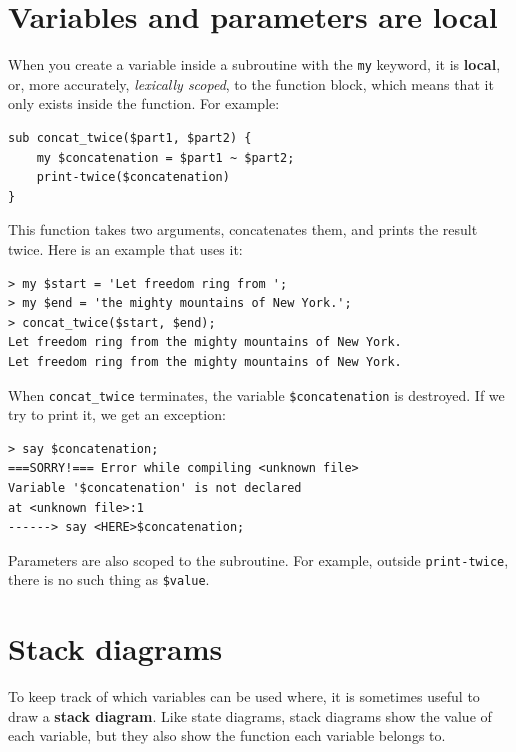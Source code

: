 \section{Variables and parameters are local}
\label{localvar}

When you create a variable inside a subroutine with the 
{\tt my} keyword, it is {\bf local}, or, more accurately, 
\emph{lexically scoped}, to the function block, which means 
that it only exists inside the function.  For example:

\begin{verbatim}
sub concat_twice($part1, $part2) {
    my $concatenation = $part1 ~ $part2;
    print-twice($concatenation)
}
\end{verbatim}
%
This function takes two arguments, concatenates them, and prints
the result twice.  Here is an example that uses it:

\begin{verbatim}
> my $start = 'Let freedom ring from ';
> my $end = 'the mighty mountains of New York.';
> concat_twice($start, $end);
Let freedom ring from the mighty mountains of New York.
Let freedom ring from the mighty mountains of New York.
\end{verbatim}
%
When \verb"concat_twice" terminates, the variable \verb"$concatenation" 
is destroyed.  If we try to print it, we get an exception:

\begin{verbatim}
> say $concatenation;
===SORRY!=== Error while compiling <unknown file>
Variable '$concatenation' is not declared
at <unknown file>:1
------> say <HERE>$concatenation;
\end{verbatim}
%
Parameters are also scoped to the subroutine.
For example, outside \verb"print-twice", there is no
such thing as \verb"$value".


\section{Stack diagrams}
\label{stackdiagram}

To keep track of which variables can be used where, it is sometimes
useful to draw a {\bf stack diagram}.  Like state diagrams, stack
diagrams show the value of each variable, but they also show the
function each variable belongs to.

